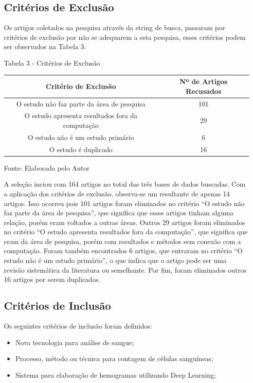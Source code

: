 \subsection{Critérios de Exclusão}

Os artigos coletados na pesquisa através da string de busca, passaram por critérios de exclusão por não se adequarem a esta pesquisa, esses critérios podem ser observados na Tabela 3. 

\begin{center}
Tabela 3 - Critérios de Exclusão
\begin{center}
\begin{tabular}{|c|c|}
\hline
\textbf{Critério de Exclusão} & \textbf{Nº de Artigos Recusados} \\ \hline
O estudo não faz parte da área de pesquisa & 101 \\ \hline
O estudo apresenta resultados fora da computação & 29 \\ \hline
O estudo não é um estudo primário & 6 \\ \hline
O estudo é duplicado & 16 \\ \hline
\end{tabular}
\end{center}
Fonte: Elaborada pelo Autor
\end{center}

A seleção inciou com 164 artigos no total das três bases de dados buscadas. Com a aplicação dos critérios de exclusão, observa-se um resultante de apenas 14 artigos. Isso ocorreu pois 101 artigos foram eliminados no critério ``O estudo não faz parte da área de pesquisa'', que significa que esses artigos tinham alguma relação, porém eram voltados a outras áreas. Outros 29 artigos foram eliminados no critério ``O estudo apresenta resultados fora da computação'', que significa que eram da área de pesquisa, porém com resultados e métodos sem conexão com a computação. Foram também encontrados 6 artigos, que entraram no critério ``O estudo não é um estudo primário'', o que indica que o artigo pode ser uma revisão sistemática da literatura ou semelhante. Por fim, foram eliminados outros 16 artigos por serem duplicados.

\subsection{Critérios de Inclusão}

Os seguintes critérios de inclusão foram definidos:
\begin{itemize}
\item Nova tecnologia para análise de sangue;
\item Processo, método ou técnica para contagem de células sanguíneas;
\item Sistema para elaboração de hemogramas utilizando Deep Learning;
\end{itemize}

